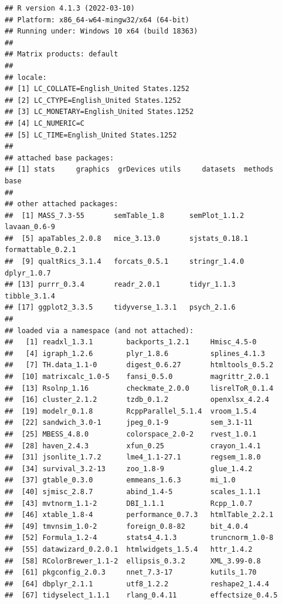 \documentclass[
]{book}
\begin{document}
\begin{verbatim}
## R version 4.1.3 (2022-03-10)
## Platform: x86_64-w64-mingw32/x64 (64-bit)
## Running under: Windows 10 x64 (build 18363)
## 
## Matrix products: default
## 
## locale:
## [1] LC_COLLATE=English_United States.1252 
## [2] LC_CTYPE=English_United States.1252   
## [3] LC_MONETARY=English_United States.1252
## [4] LC_NUMERIC=C                          
## [5] LC_TIME=English_United States.1252    
## 
## attached base packages:
## [1] stats     graphics  grDevices utils     datasets  methods   base     
## 
## other attached packages:
##  [1] MASS_7.3-55       semTable_1.8      semPlot_1.1.2     lavaan_0.6-9     
##  [5] apaTables_2.0.8   mice_3.13.0       sjstats_0.18.1    formattable_0.2.1
##  [9] qualtRics_3.1.4   forcats_0.5.1     stringr_1.4.0     dplyr_1.0.7      
## [13] purrr_0.3.4       readr_2.0.1       tidyr_1.1.3       tibble_3.1.4     
## [17] ggplot2_3.3.5     tidyverse_1.3.1   psych_2.1.6      
## 
## loaded via a namespace (and not attached):
##   [1] readxl_1.3.1        backports_1.2.1     Hmisc_4.5-0        
##   [4] igraph_1.2.6        plyr_1.8.6          splines_4.1.3      
##   [7] TH.data_1.1-0       digest_0.6.27       htmltools_0.5.2    
##  [10] matrixcalc_1.0-5    fansi_0.5.0         magrittr_2.0.1     
##  [13] Rsolnp_1.16         checkmate_2.0.0     lisrelToR_0.1.4    
##  [16] cluster_2.1.2       tzdb_0.1.2          openxlsx_4.2.4     
##  [19] modelr_0.1.8        RcppParallel_5.1.4  vroom_1.5.4        
##  [22] sandwich_3.0-1      jpeg_0.1-9          sem_3.1-11         
##  [25] MBESS_4.8.0         colorspace_2.0-2    rvest_1.0.1        
##  [28] haven_2.4.3         xfun_0.25           crayon_1.4.1       
##  [31] jsonlite_1.7.2      lme4_1.1-27.1       regsem_1.8.0       
##  [34] survival_3.2-13     zoo_1.8-9           glue_1.4.2         
##  [37] gtable_0.3.0        emmeans_1.6.3       mi_1.0             
##  [40] sjmisc_2.8.7        abind_1.4-5         scales_1.1.1       
##  [43] mvtnorm_1.1-2       DBI_1.1.1           Rcpp_1.0.7         
##  [46] xtable_1.8-4        performance_0.7.3   htmlTable_2.2.1    
##  [49] tmvnsim_1.0-2       foreign_0.8-82      bit_4.0.4          
##  [52] Formula_1.2-4       stats4_4.1.3        truncnorm_1.0-8    
##  [55] datawizard_0.2.0.1  htmlwidgets_1.5.4   httr_1.4.2         
##  [58] RColorBrewer_1.1-2  ellipsis_0.3.2      XML_3.99-0.8       
##  [61] pkgconfig_2.0.3     nnet_7.3-17         kutils_1.70        
##  [64] dbplyr_2.1.1        utf8_1.2.2          reshape2_1.4.4     
##  [67] tidyselect_1.1.1    rlang_0.4.11        effectsize_0.4.5   

\end{verbatim}
\end{document}
